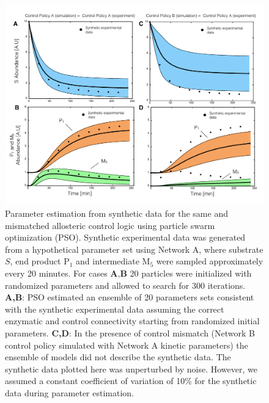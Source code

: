 \documentclass[processes,article,accept,moreauthors,pdftex,12pt,a4paper]{mdpi}
\begin{document}
\begin{figure}[H]
\centering
\includegraphics[width=1.0\textwidth]{./figs/Figure-5-ParameterFit.pdf}
\caption{Parameter estimation from synthetic data for the same and mismatched allosteric control logic using particle swarm optimization (PSO). 
Synthetic experimental data was generated from a hypothetical parameter set using Network A, 
where substrate $S$, end product P$_{1}$ and intermediate M$_5$ were sampled approximately every 20 minutes. 
For cases $\textbf{A,B}$ 20 particles were initialized with randomized parameters and allowed to search for 300 iterations. 
\textbf{A,B}: PSO estimated an ensemble of 20 parameters sets consistent with the synthetic experimental data assuming the correct
enzymatic and control connectivity starting from randomized initial parameters.
\textbf{C,D}: In the presence of control mismatch (Network B control policy simulated with Network A kinetic parameters) 
the ensemble of models did not describe the synthetic data. The synthetic data plotted here was unperturbed by noise. 
However, we assumed a constant coefficient of variation of 10\% for the synthetic data during parameter estimation.}\label{fig-parameter-fit}
\end{figure}
\end{document}
